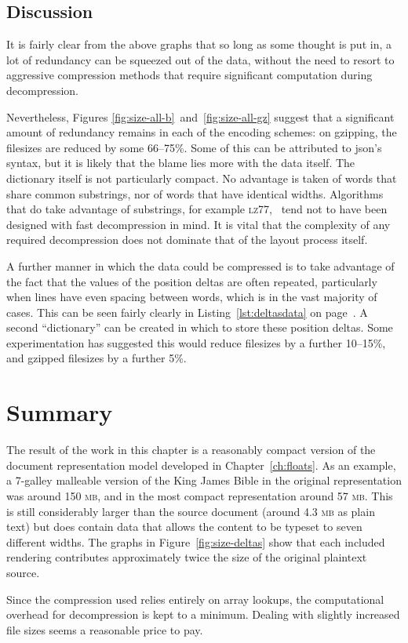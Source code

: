 \subsection{Discussion}

It is fairly clear from the above graphs that so long as some thought is put in, a lot of redundancy can be squeezed out of the data, without the need to resort to aggressive compression methods that require significant computation during decompression.

Nevertheless, Figures \ref{fig:size-all-b}~and~\ref{fig:size-all-gz} suggest that a significant amount of redundancy remains in each of the encoding schemes: on gzipping, the filesizes are reduced by some 66--75\%. Some of this can be attributed to \gls{json}'s syntax, but it is likely that the blame lies more with the data itself. The dictionary itself is not particularly compact. No advantage is taken of words that share common substrings, nor of words that have identical widths.
Algorithms that do take advantage of substrings, for example \textsc{lz77},~\cite{Ziv1977} tend not to have been designed with fast decompression in mind. It is vital that the complexity of any required decompression does not dominate that of the layout process itself.

A further manner in which the data could be compressed is to take advantage of the fact that the values of the position deltas are often repeated, particularly when lines have even spacing between words, which is in the vast majority of cases. This can be seen fairly clearly in Listing~\ref{lst:deltasdata} on page~\pageref{lst:deltasdata}. A second ``dictionary'' can be created in which to store these position deltas. Some experimentation has suggested this would reduce filesizes by a further 10--15\%, and gzipped filesizes by a further 5\%.

\section{Summary}

The result of the work in this chapter is a reasonably compact version of the document representation model developed in Chapter~\ref{ch:floats}. As an example, a 7-galley malleable version of the King James Bible in the original representation was around 150 \textsc{mb}, and in the most compact representation around 57 \textsc{mb}. This is still considerably larger than the source document (around 4.3 \textsc{mb} as plain text) but does contain data that allows the content to be typeset to seven different widths. The graphs in Figure~\ref{fig:size-deltas} show that each included rendering contributes approximately twice the size of the original plaintext source.

Since the compression used relies entirely on array lookups, the computational overhead for decompression is kept to a minimum. Dealing with slightly increased file sizes seems a reasonable price to pay.
